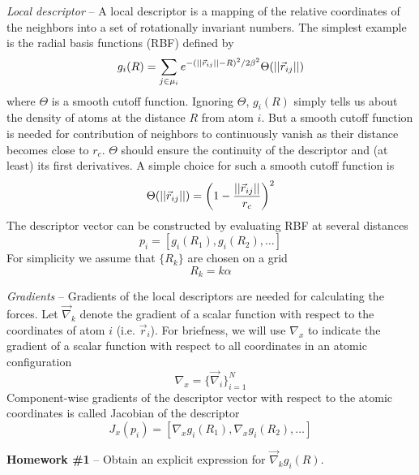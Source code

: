 \documentclass[12pt]{article}
\DeclarePairedDelimiter\paren{(}{)}
\DeclarePairedDelimiter\norm{||}{||}
\newcommand{\neighbors}{\mu}
\newcommand{\cutoff}{r_c}
\newcommand{\scf}{\Theta}               %
\newcommand{\des}{p}
\newcommand{\rbf}{g}                    %
\newcommand{\gradients}{{\nabla}}
\newcommand{\jacobian}{J}
\begin{document}
\emph{Local descriptor} --
A local descriptor is a mapping of the relative
coordinates of the neighbors into a set
of rotationally invariant numbers.
The simplest example is the radial basis functions
(RBF) defined by
\begin{equation}\label{eq:rbf}
    \rbf_i(R) =
        \sum_{j\in\neighbors_i}
            e^{-(\norm*{\vec{r}_{ij}}-R)^2/2\beta^2}
            \scf(\norm*{\vec{r}_{ij}})
\end{equation}
where $\scf$ is a smooth cutoff function.
Ignoring $\scf$, $\rbf_i(R)$ simply tells us
about the density of atoms at the distance $R$ from
atom $i$.
But a smooth cutoff function is needed for
contribution of neighbors to continuously vanish
as their distance becomes close to $\cutoff$.
$\scf$ should ensure the continuity of the descriptor
and (at least) its first derivatives.
A simple choice for such a smooth cutoff function is
\begin{equation}\label{eq:scf}
    \scf(\norm*{\vec{r}_{ij}}) =
        \paren*{1-\frac{\norm*{\vec{r}_{ij}}}{\cutoff}}^2
\end{equation}
The descriptor vector can be constructed by
evaluating RBF at several distances
\begin{equation}\label{eq:descriptor}
    \des_i = [\rbf_i(R_1), \rbf_i(R_2), \ldots]
\end{equation}
For simplicity we assume that $\{R_k\}$ are
chosen on a grid
\begin{equation}\label{eq:grid}
    R_k = k \alpha
\end{equation}

\emph{Gradients} --
Gradients of the local descriptors are needed for
calculating the forces.
Let $\vec{\nabla}_k$ denote the gradient of a scalar
function with respect to the coordinates of atom $i$
(i.e. $\vec{r}_i$).
For briefness, we will use $\gradients_x$ to indicate
the gradient of a scalar function with respect to
all coordinates in an atomic configuration
\begin{equation}\label{eq:graients}
    \gradients_x = \{\vec{\nabla}_i\}_{i=1}^{N}
\end{equation}
Component-wise gradients of the descriptor vector
with respect to the atomic coordinates is called
Jacobian of the descriptor
\begin{equation}
    \jacobian_x(\des_i) =
        [\gradients_x \rbf_i(R_1),
        \gradients_x \rbf_i(R_2),
        \ldots]
\end{equation}

\textbf{Homework \#1} --
Obtain an explicit expression for $\vec{\nabla}_k \rbf_i(R)$.
\end{document}
